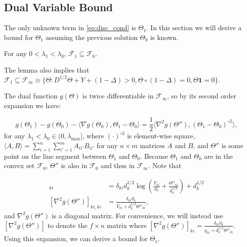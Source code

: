 \subsection{Dual Variable Bound}


The only unknown term in \eqref{eq:disc_cond} is $\Theta_{1}$. In this section we will derive a bound for $\Theta_{1}$ assuming the previous solution $\Theta_{0}$ is known.

\begin{lemma}
    \label{lem:1}
    For any $0<\lambda_1<\lambda_0$, $\mathcal{F}_{1}\subseteq\mathcal{F}_{0}$.
\end{lemma}

The lemma also implies that $\mathcal{F}_{1}\subseteq\mathcal{F}_{\infty}\equiv\{\Theta: D^{1/2}\Theta+Y+(1-\Delta)> 0,\Theta\circ(1-\Delta)=0, \Theta\mathbf{1}=0\}$.

The dual function $g(\Theta)$ is twice differentiable in $\mathcal{F}_{\infty}$, so by its second order expansion we have:

\begin{equation}
        \label{eq:expand}
        g(\Theta_{1})-g(\Theta_{0})-\langle\nabla g(\Theta_{0}),\Theta_{1}-\Theta_{0}\rangle=\frac{1}{2}\langle\nabla^2 g(\Theta''),(\Theta_{1}-\Theta_{0})^{\circ 2}\rangle,%
\end{equation}
for any $\lambda_1<\lambda_{0}\in (0,\lambda_\textrm{max}]$, where $(\cdot)^{\circ2}$ is element-wise square, $\langle A,B\rangle=\sum_{i=1}^n\sum_{i'=1}^mA_{ii'}B_{ii'}$ for any $n\times m$ matrices $A$ and $B$, and $\Theta''$ is some point on the line segment between $\Theta_{1}$ and $\Theta_{0}$. Because $\Theta_{1}$ and $\Theta_{0}$ are in the convex set $\mathcal{F}_{0}$, $\Theta''$ is also in $\mathcal{F}_{0}$ and thus in $\mathcal{F}_{\infty}$. Note that

\begin{align*}
  [\nabla g(\Theta'')]_{ki} &= \delta_{ki}d_k^{1/2}\log\left(\frac{Y_{ki}}{d_k}+\frac{\Theta''_{ki}}{d_k^{1/2}}\right)+d_k^{1/2} \\
  [\nabla^2 g(\Theta'')]_{ki,ki} &= \frac{\delta_{ki}d_k}{Y_{ki}+d_k^{1/2}\Theta''_{ki}},
\end{align*}
and $\nabla^2 g(\Theta'')$ is a diagonal matrix. For convenience, we will instead use $[\nabla^2 g(\Theta'')]$ to denote the $f\times n$ matrix where $[\nabla^2 g(\Theta'')]_{ki}=\frac{\delta_{ki}d_k}{y_{ki}+d_k^{1/2}\Theta''_{ki}}$. Using this expansion, we can derive a bound for $\Theta_{1}$.

